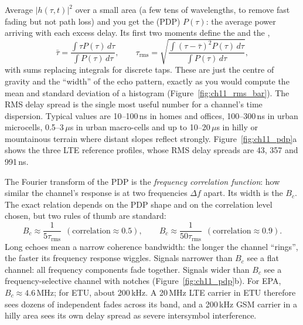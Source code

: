 
Average $|h(\tau,t)|^2$ over a small area (a few tens of wavelengths, to remove fast fading but
not path loss) and you get the  (PDP) $P(\tau)$: the average power
arriving with each excess delay. Its first two moments define the  and
the ,
\begin{equation}
\bar\tau=\frac{\int\tau P(\tau)\,d\tau}{\int P(\tau)\,d\tau},\qquad
\tau_{\text{rms}}=\sqrt{\frac{\int(\tau-\bar\tau)^2P(\tau)\,d\tau}{\int P(\tau)\,d\tau}} ,
\label{eq:ch11:taurms}
\end{equation}
with sums replacing integrals for discrete taps. These are just the centre of gravity and the
``width'' of the echo pattern, exactly as you would compute the mean and standard deviation of a
histogram (Figure~\ref{fig:ch11_rms_bar}). The RMS delay spread is the single most useful number for a channel's time
dispersion. Typical values are 10--100\,ns in homes and offices, 100--300\,ns in urban microcells,
0.5--3\,$\mu$s in urban macro-cells and up to 10--20\,$\mu$s in hilly or mountainous terrain where
distant slopes reflect strongly. Figure~\ref{fig:ch11_pdp}a shows the three LTE reference profiles,
whose RMS delay spreads are 43, 357 and 991\,ns.



The Fourier transform of the PDP is the \emph{frequency correlation function}: how similar the
channel's response is at two frequencies $\Delta f$ apart. Its width is the  $B_c$. The exact relation depends on the PDP shape and on the correlation level chosen,
but two rules of thumb are standard:
\begin{equation}
B_c\approx\frac{1}{5\tau_{\text{rms}}}\ \ (\text{correlation}\approx0.5),\qquad
B_c\approx\frac{1}{50\tau_{\text{rms}}}\ \ (\text{correlation}\approx0.9).
\label{eq:ch11:bc}
\end{equation}
Long echoes mean a narrow coherence bandwidth: the longer the channel ``rings'', the faster its
frequency response wiggles. Signals narrower than $B_c$ see a flat channel: all frequency
components fade together. Signals wider than $B_c$ see a frequency-selective channel with notches
(Figure~\ref{fig:ch11_pdp}b). For EPA, $B_c\approx4.6$\,MHz; for ETU, about 200\,kHz. A 20\,MHz LTE
carrier in ETU therefore sees dozens of independent fades across its band, and a 200\,kHz GSM
carrier in a hilly area sees its own delay spread as severe intersymbol interference.

